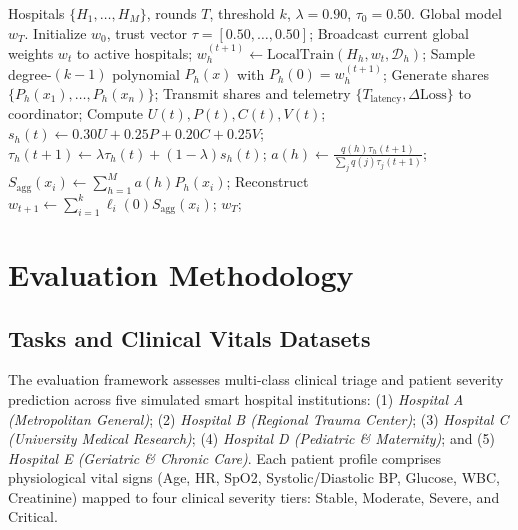\documentclass[conference]{IEEEtran}
\begin{document}
\begin{algorithm}[ht]
\caption{Adaptive Trust-Aware Federated Learning}
\begin{algorithmic}[1]
\REQUIRE Hospitals $\{H_1, \dots, H_M\}$, rounds $T$, threshold $k$, $\lambda = 0.90$, $\tau_0 = 0.50$.
\ENSURE Global model $w_T$.
\STATE Initialize $w_0$, trust vector $\tau = [0.50, \dots, 0.50]$;
    \STATE Broadcast current global weights $w_t$ to active hospitals;
        \STATE $w_h^{(t+1)} \leftarrow \text{LocalTrain}(H_h, w_t, \mathcal{D}_h)$;
        \STATE Sample degree-$(k-1)$ polynomial $P_h(x)$ with $P_h(0) = w_h^{(t+1)}$;
        \STATE Generate shares $\{P_h(x_1), \dots, P_h(x_n)\}$;
        \STATE Transmit shares and telemetry $\{T_{\text{latency}}, \Delta \text{Loss}\}$ to coordinator;
    \ENDFOR
        \STATE Compute $U(t), P(t), C(t), V(t)$;
        \STATE $s_h(t) \leftarrow 0.30 U + 0.25 P + 0.20 C + 0.25 V$;
        \STATE $\tau_h(t+1) \leftarrow \lambda \tau_h(t) + (1-\lambda) s_h(t)$;
    \ENDFOR
        \STATE $a(h) \leftarrow \frac{q(h)\tau_h(t+1)}{\sum_j q(j)\tau_j(t+1)}$;
    \ENDFOR
        \STATE $S_{\text{agg}}(x_i) \leftarrow \sum_{h=1}^M a(h) P_h(x_i)$;
    \ENDFOR
    \STATE Reconstruct $w_{t+1} \leftarrow \sum_{i=1}^k \ell_i(0) S_{\text{agg}}(x_i)$;
\ENDFOR
\RETURN $w_T$;
\end{algorithmic}
\end{algorithm}

\section{Evaluation Methodology}

\subsection{Tasks and Clinical Vitals Datasets}
The evaluation framework assesses multi-class clinical triage and patient severity prediction across five simulated smart hospital institutions: (1) \textit{Hospital A (Metropolitan General)}; (2) \textit{Hospital B (Regional Trauma Center)}; (3) \textit{Hospital C (University Medical Research)}; (4) \textit{Hospital D (Pediatric \& Maternity)}; and (5) \textit{Hospital E (Geriatric \& Chronic Care)}. Each patient profile comprises physiological vital signs (Age, HR, SpO2, Systolic/Diastolic BP, Glucose, WBC, Creatinine) mapped to four clinical severity tiers: Stable, Moderate, Severe, and Critical.
\end{document}
